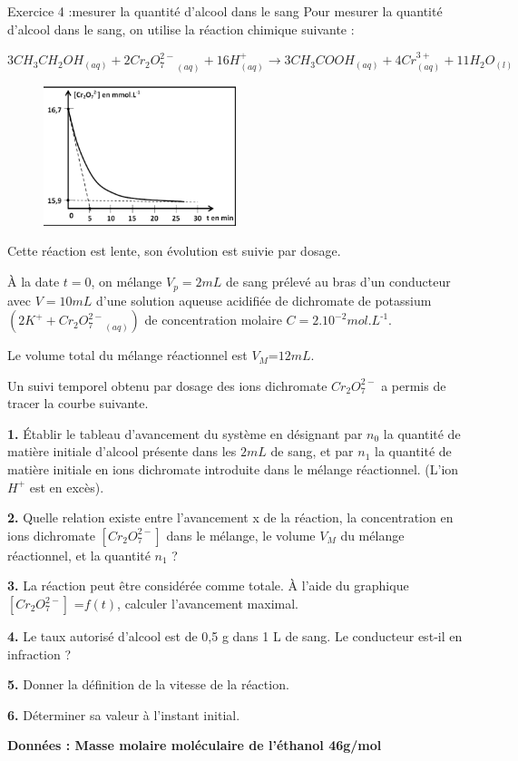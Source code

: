 \documentclass[12pt, french]{article}
\begin{document}
\vspace{-0.6cm}
\begin{Box2}{Exercice 4 :mesurer la quantité d’alcool dans le sang }
Pour mesurer la quantité d’alcool dans le sang, on utilise la réaction chimique suivante :

$3CH_3CH_2OH_{(aq)} + {2Cr_2O_7^{2-}}_{(aq)} + 16H^+_{(aq)} \rightarrow 3CH_3COOH_{(aq)} + 4Cr^{3+}_{(aq)} + 11H_2O_{(l)}$

	\begin{figure}
  \begin{center}
	  \vspace{-0.6cm}
	\includegraphics[width=0.5\textwidth]{./img/ex5.png}
  \end{center}
\end{figure}


Cette réaction est
lente, son évolution est suivie par dosage.

À la date $t = 0$, on mélange $V_p=2mL$ de sang prélevé au bras d’un conducteur avec $V= 10mL$ d’une solution aqueuse acidifiée de dichromate de potassium $(2K^+ + {Cr_2O_7^{2-}}_{(aq)})$ de concentration molaire $C=2.10^{-2} mol.L^{‐1}$.

Le volume total du mélange réactionnel est $V_M$=$12 mL$.

Un suivi temporel obtenu par dosage des ions dichromate $Cr_2O_7^{2-}$ a permis de tracer la courbe suivante.

\textbf{1. }Établir le tableau d’avancement du système en désignant par $n_0$ la quantité de matière initiale
d’alcool présente dans les $2mL$ de sang, et par $n_1$ la quantité de matière initiale en ions dichromate introduite dans le mélange réactionnel. (L’ion $H^+$ est en excès).

\textbf{2. }Quelle relation existe entre l’avancement x de la réaction, la concentration en ions dichromate $[Cr_2O_7^{2-}]$ dans le mélange, le volume $V_M$ du mélange réactionnel, et la quantité $n_1$ ?

\textbf{3. }La réaction peut être considérée comme
totale. À l’aide du graphique $[Cr_2O_7^{2-}]$ =$ f(t)$,
calculer l’avancement maximal.

\textbf{4. }Le taux autorisé d’alcool est de 0,5 g dans 1 L
de sang. Le conducteur est‐il en infraction ?

\textbf{5. }Donner la définition de la vitesse de la
réaction.

\textbf{6. }Déterminer sa valeur à l’instant initial.

\textbf{Données : Masse molaire moléculaire de l’éthanol 46g/mol}

\end{Box2}
\end{document}
